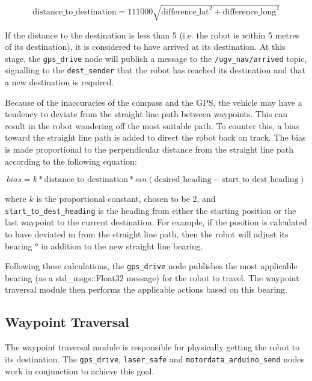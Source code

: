 \documentclass[titlepage,12pt,a4paper]{article}
\begin{document}
\pagebreak


\begin{equation}
	\text{distance\_to\_destination} = 111000\sqrt{\text{difference\_lat}^2+ \text{difference\_long}^2}
\end{equation}

If the distance to the destination is less than 5 (i.e. the robot is within 5 metres of its destination), it is considered to have arrived at its destination. At this stage, the \verb|gps_drive| node will publish a message to the \verb|/ugv_nav/arrived| topic, signalling to the \verb|dest_sender| that the robot has reached its destination and that a new destination is required.

Because of the inaccuracies of the compass and the GPS, the vehicle may have a tendency to deviate from the straight line path between waypoints. This can result in the robot wandering off the most suitable path. To counter this, a bias toward the straight line path is added to direct the robot back on track. The bias is made proportional to the perpendicular distance from the straight line path according to the following equation:

\begin{equation}
bias = k * \text{distance\_to\_destination} * sin(\text{desired\_heading}-\text{start\_to\_dest\_heading})
\end{equation}

where \(k\) is the proportional constant, chosen to be 2, and \verb|start_to_dest_heading| is the heading from either the starting position or the last waypoint to the current destination. For example, if the position is calculated to have deviated \unit[5]{m} from the straight line path, then the robot will adjust its bearing \unit[10]{\degree} in addition to the new straight line bearing.


Following these calculations, the \verb|gps_drive| node publishes the most applicable bearing (as a std\_msgs::Float32 message) for the robot to travel. The waypoint traversal module then performs the applicable actions based on this bearing.


\subsection{Waypoint Traversal}
The waypoint traversal module is responsible for physically getting the robot to its destination. The \verb|gps_drive|, \verb|laser_safe| and \verb|motordata_arduino_send| nodes work in conjunction to achieve this goal.
\end{document}
